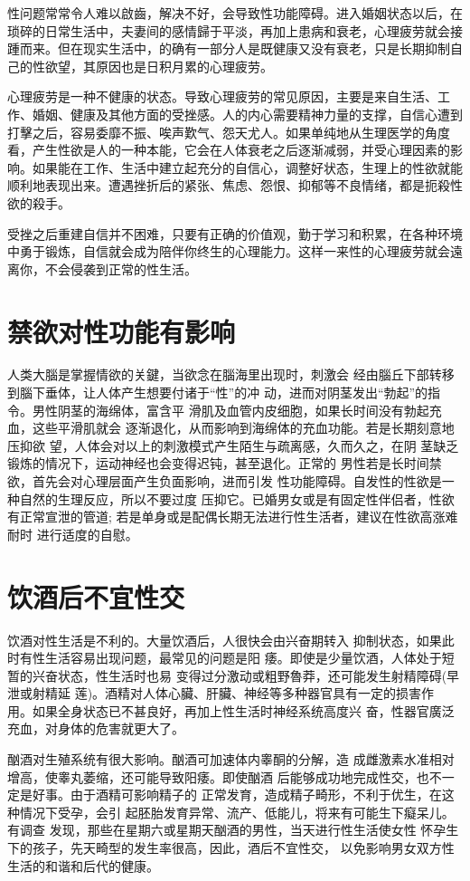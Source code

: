 \documentclass[12pt,UTF8]{ctexbook}
\begin{document}
性问题常常令人难以啟齒，解决不好，会导致性功能障碍。进入婚姻状态以后，在琐碎的日常生活中，夫妻间的感情歸于平淡，再加上患病和衰老，心理疲劳就会接踵而来。但在现实生活中，的确有一部分人是既健康又没有衰老，只是长期抑制自己的性欲望，其原因也是日积月累的心理疲劳。

心理疲劳是一种不健康的状态。导致心理疲劳的常见原因，主要是来自生活、工作、婚姻、健康及其他方面的受挫感。人的内心需要精神力量的支撑，自信心遭到打擊之后，容易委靡不振、唉声歎气、怨天尤人。如果单纯地从生理医学的角度看，产生性欲是人的一种本能，它会在人体衰老之后逐渐减弱，并受心理因素的影响。如果能在工作、生活中建立起充分的自信心，调整好状态，生理上的性欲就能顺利地表现出来。遭遇挫折后的紧张、焦虑、怨恨、抑郁等不良情绪，都是扼殺性欲的殺手。

受挫之后重建自信并不困难，只要有正确的价值观，勤于学习和积累，在各种环境中勇于锻炼，自信就会成为陪伴你终生的心理能力。这样一来性的心理疲劳就会遠离你，不会侵袭到正常的性生活。

\section{禁欲对性功能有影响}

人类大腦是掌握情欲的关鍵，当欲念在腦海里出现时，刺激会
经由腦丘下部转移到腦下垂体，让人体产生想要付诸于“性”的冲
动，进而对阴茎发出“勃起”的指令。男性阴茎的海绵体，富含平
滑肌及血管内皮细胞，如果长时间没有勃起充血，这些平滑肌就会
逐渐退化，从而影响到海绵体的充血功能。若是长期刻意地压抑欲
望，人体会对以上的刺激模式产生陌生与疏离感，久而久之，在阴
茎缺乏锻炼的情况下，运动神经也会变得迟钝，甚至退化。正常的
男性若是长时间禁欲，首先会对心理层面产生负面影响，进而引发
性功能障碍。自发性的性欲是一种自然的生理反应，所以不要过度
压抑它。已婚男女或是有固定性伴侣者，性欲有正常宣泄的管道;
若是单身或是配偶长期无法进行性生活者，建议在性欲高涨难耐时
进行适度的自慰。

\section{饮酒后不宜性交}

饮酒对性生活是不利的。大量饮酒后，人很快会由兴奋期转入
抑制状态，如果此时有性生活容易出现问题，最常见的问题是阳
痿。即使是少量饮酒，人体处于短暂的兴奋状态，性生活时也易
变得过分激动或粗野魯莽，还可能发生射精障碍(早泄或射精延
莲)。酒精对人体心臟、肝臟、神经等多种器官具有一定的损害作
用。如果全身状态已不甚良好，再加上性生活时神经系统高度兴
奋，性器官廣泛充血，对身体的危害就更大了。

酗酒对生殖系统有很大影响。酗酒可加速体内睾酮的分解，造
成雌激素水准相对增高，使睾丸萎缩，还可能导致阳痿。即使酗酒
后能够成功地完成性交，也不一定是好事。由于酒精可影响精子的
正常发育，造成精子畸形，不利于优生，在这种情况下受孕，会引
起胚胎发育异常、流产、低能儿，将来有可能生下癡呆儿。有调查
发现，那些在星期六或星期天酗酒的男性，当天进行性生活使女性
怀孕生下的孩子，先天畸型的发生率很高，因此，酒后不宜性交，
以免影响男女双方性生活的和谐和后代的健康。
\end{document}
